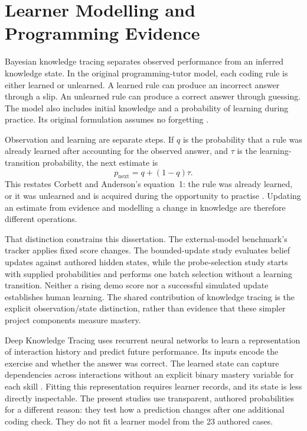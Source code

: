 \section{Learner Modelling and Programming Evidence}

Bayesian knowledge tracing separates observed performance from an inferred knowledge state. In the original programming-tutor
model, each coding rule is either learned or unlearned. A learned rule can produce an incorrect answer through a slip. An
unlearned rule can produce a correct answer through guessing. The model also includes initial knowledge and a probability of
learning during practice. Its original formulation assumes no forgetting
\parencite[Section 3, pp.~260--261, Figure 4]{corbett1994knowledge}.

Observation and learning are separate steps. If $q$ is the probability that a rule was already learned after accounting for
the observed answer, and $\tau$ is the learning-transition probability, the next estimate is
\begin{equation}
 p_{\mathrm{next}}=q+(1-q)\tau.
\end{equation}
This restates Corbett and Anderson's equation~1: the rule was already learned, or it was unlearned and is acquired during the
opportunity to practise \parencite[p.~261]{corbett1994knowledge}. Updating an estimate from evidence and modelling a change in
knowledge are therefore different operations.

That distinction constrains this dissertation. The external-model benchmark's tracker applies fixed score changes. The
bounded-update study evaluates belief updates against authored hidden states, while the probe-selection study starts with supplied probabilities and performs
one batch selection without a learning transition. Neither a rising demo score nor a successful simulated update establishes
human learning. The shared contribution of knowledge tracing is the explicit observation/state distinction, rather than evidence
that these simpler project components measure mastery.

Deep Knowledge Tracing uses recurrent neural networks to learn a representation of interaction history and predict future
performance. Its inputs encode the exercise and whether the answer was correct. The learned state can capture dependencies
across interactions without an explicit binary mastery variable for each skill
\parencite[Section 3]{piech2015dkt}. Fitting this representation requires learner records, and its state is less directly inspectable.
The present studies use transparent, authored probabilities for a different reason: they test how a prediction changes after
one additional coding check. They do not fit a learner model from the 23 authored cases.


